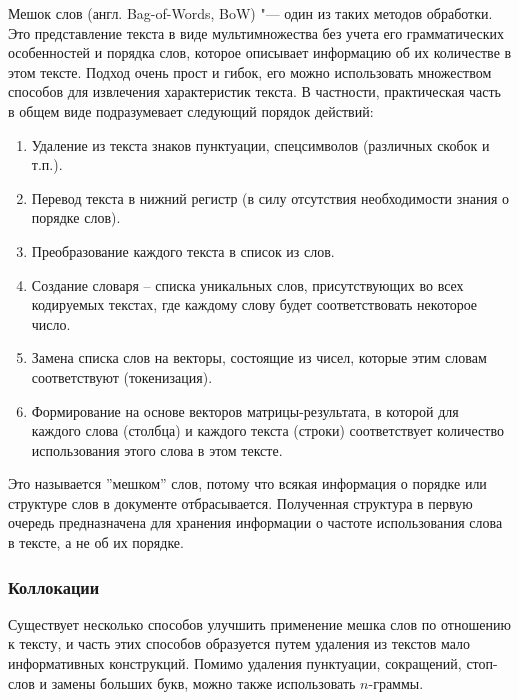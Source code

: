 \documentclass[bachelor, och, coursework]{SCWorks}
\begin{document}
            Мешок слов (англ. Bag-of-Words, BoW) "--- один из таких методов
            обработки. Это представление текста в виде мультимножества без учета
            его грамматических особенностей и порядка слов, которое описывает
            информацию об их количестве в этом тексте. Подход очень прост и
            гибок, его можно использовать множеством способов для извлечения
            характеристик текста. В частности, практическая часть в общем виде
            подразумевает следующий порядок действий:

            \begin{enumerate}
                \item Удаление из текста знаков пунктуации, спецсимволов
                (различных скобок и т.п.).
                \item Перевод текста в нижний регистр (в силу отсутствия
                необходимости знания о порядке слов).
                \item Преобразование каждого текста в список из слов.
                \item Создание словаря – списка уникальных слов, присутствующих
                во всех кодируемых текстах, где каждому слову будет
                соответствовать некоторое число.
                \item Замена списка слов на векторы, состоящие из чисел, которые
                этим словам соответствуют (токенизация).
                \item Формирование на основе векторов матрицы-результата, в
                которой для каждого слова (столбца) и каждого текста (строки)
                соответствует количество использования этого слова в этом
                тексте.

            \end{enumerate}

            Это называется ''мешком'' слов, потому что всякая информация о
            порядке или структуре слов в документе отбрасывается. Полученная
            структура в первую очередь предназначена для хранения информации о
            частоте использования слова в тексте, а не об их порядке. \cite{bow}

        \subsubsection{Коллокации}

            Существует несколько способов улучшить применение мешка слов по
            отношению к тексту, и часть этих способов образуется путем удаления
            из текстов мало информативных конструкций. Помимо удаления
            пунктуации, сокращений, стоп-слов и замены больших букв, можно также
            использовать $n$-граммы.
            
\end{document}
